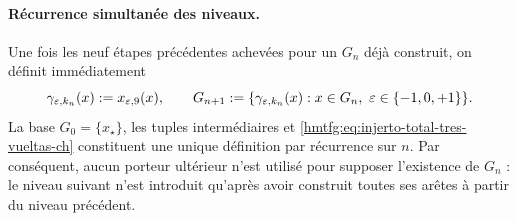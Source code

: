 \paragraph{Récurrence simultanée des niveaux.}
Une fois les neuf étapes précédentes achevées pour un \(G_n\) déjà construit,
on définit immédiatement
\begin{equation}
 \gamma_{\varepsilon,k_n}(x):=x_{\varepsilon,9}(x),\qquad
 G_{n+1}:=\{\gamma_{\varepsilon,k_n}(x):
       x\in G_n,\ \varepsilon\in\{-1,0,+1\}\}.
 \label{hmtfg:eq:injerto-total-tres-vueltas-ch}
\end{equation}
\label{hmtfg:eq:tres-vueltas-tpk-ch}
La base \(G_0=\{x_\star\}\), les tuples intermédiaires et
\eqref{hmtfg:eq:injerto-total-tres-vueltas-ch} constituent une unique définition par
récurrence sur \(n\). Par conséquent, aucun porteur ultérieur n’est utilisé pour
supposer l’existence de \(G_n\) : le niveau suivant n’est introduit
qu’après avoir construit toutes ses arêtes à partir du niveau précédent.

